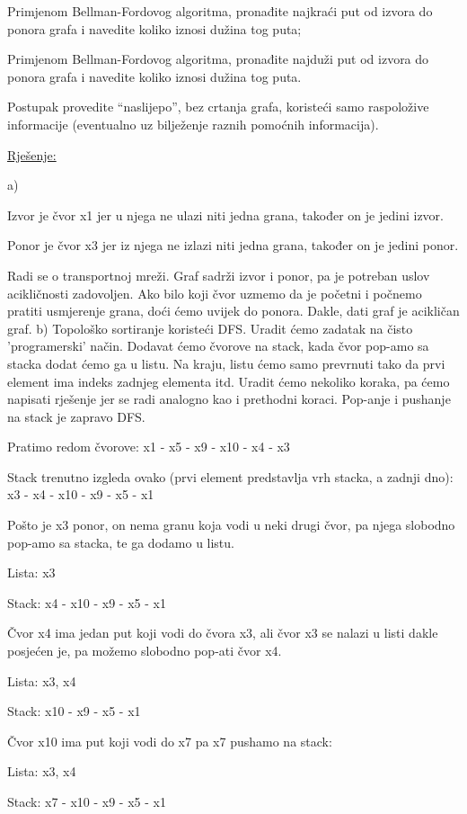 \documentclass[12pt]{article}
\begin{document}
Primjenom Bellman-Fordovog algoritma, pronađite najkraći put od izvora do ponora grafa i navedite koliko iznosi dužina tog puta;

Primjenom Bellman-Fordovog algoritma, pronađite najduži put od izvora do ponora grafa i navedite koliko iznosi dužina tog puta.

Postupak provedite “naslijepo”, bez crtanja grafa, koristeći samo raspoložive informacije (eventualno uz bilježenje raznih pomoćnih informacija).


\underline{Rješenje:}

a)

Izvor je čvor x1 jer u njega ne ulazi niti jedna grana, također on je jedini izvor. 

Ponor je čvor x3 jer iz njega ne izlazi niti jedna grana, također on je jedini ponor.

Radi se o transportnoj mreži. Graf sadrži izvor i ponor, pa je potreban uslov acikličnosti zadovoljen. Ako bilo koji čvor uzmemo da je početni i počnemo pratiti usmjerenje grana, doći ćemo uvijek do ponora. Dakle, dati graf je acikličan graf.
\newpage
b) Topološko sortiranje koristeći DFS. Uradit ćemo zadatak na čisto 'programerski' način. Dodavat ćemo čvorove na stack, kada čvor pop-amo sa stacka dodat ćemo ga u listu. Na kraju, listu ćemo samo prevrnuti tako da prvi element ima indeks zadnjeg elementa itd. Uradit ćemo nekoliko koraka, pa ćemo napisati rješenje jer se radi analogno kao i prethodni koraci. Pop-anje i pushanje na stack je zapravo DFS.

Pratimo redom čvorove: x1 - x5 - x9 - x10 - x4 - x3

Stack trenutno izgleda ovako (prvi element predstavlja vrh stacka, a zadnji dno): x3 - x4 - x10 - x9 - x5 - x1 

Pošto je x3 ponor, on nema granu koja vodi u neki drugi čvor, pa njega slobodno pop-amo sa stacka, te ga dodamo u listu. 

Lista: x3

Stack: x4 - x10 - x9 - x5 - x1

Čvor x4 ima jedan put koji vodi do čvora x3, ali čvor x3 se nalazi u listi dakle posjećen je, pa možemo slobodno pop-ati čvor x4.

Lista: x3, x4

Stack: x10 - x9 - x5 - x1

Čvor x10 ima put koji vodi do x7 pa x7 pushamo na stack:

Lista: x3, x4

Stack: x7 - x10 - x9 - x5 - x1
\end{document}
